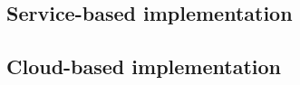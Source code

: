 \subsection{Service-based implementation}
\label{subsec:service-based-implementation}

\subsection{Cloud-based implementation}
\label{subsec:cloud-based-implementation}
